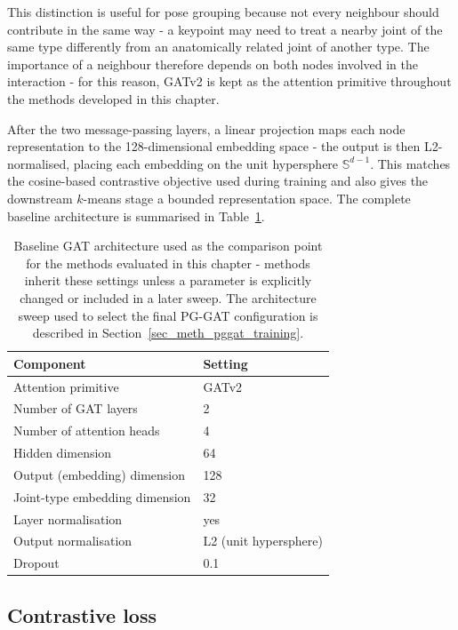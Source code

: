 This distinction is useful for pose grouping
because not every neighbour should contribute in the same way -
a keypoint may need to treat a nearby joint of the same type
differently from an anatomically related joint of another type.
The importance of a neighbour therefore depends on both nodes involved in the interaction -
for this reason,
GATv2 is kept as the attention primitive throughout the methods developed in this chapter.

After the two message-passing layers,
a linear projection maps each node representation to the 128-dimensional embedding space -
the output is then L2-normalised,
placing each embedding on the unit hypersphere $\mathbb{S}^{d-1}$.
This matches the cosine-based contrastive objective used during training
and also gives the downstream $k$-means stage a bounded representation space.
The complete baseline architecture is summarised in Table~\ref{tab:baseline_arch}.

\begin{table}[H]
\centering
\caption[Baseline GAT architecture used as the comparison point for the evaluated methods.]{Baseline GAT architecture used as the comparison point for the
methods evaluated in this chapter - methods inherit these settings
unless a parameter is explicitly changed or included in a later sweep.
The architecture sweep used to select the final PG-GAT configuration
is described in Section~\ref{sec_meth_pggat_training}.}
\label{tab:baseline_arch}
\tablesize
\begin{tabular}{ll}
\toprule
Component & Setting \\
\midrule
Attention primitive            & GATv2~\cite{brody2022gatv2} \\
Number of GAT layers           & 2 \\
Number of attention heads      & 4 \\
Hidden dimension               & 64 \\
Output (embedding) dimension   & 128 \\
Joint-type embedding dimension & 32 \\
Layer normalisation            & yes \\
Output normalisation           & L2 (unit hypersphere) \\
Dropout                        & 0.1 \\
\bottomrule
\end{tabular}
\end{table}

\subsection{Contrastive loss}
\label{sec_meth_baseline_loss}

